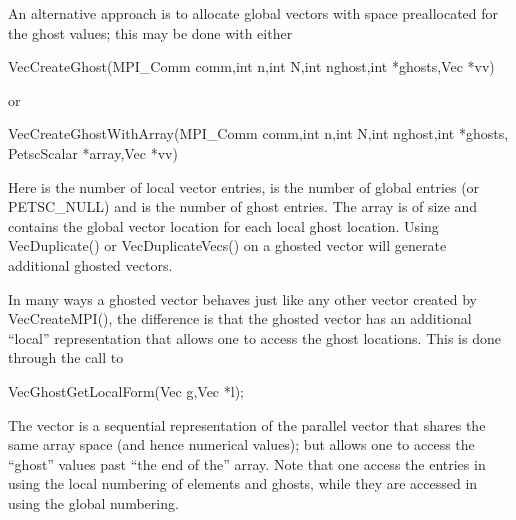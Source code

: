 An alternative approach is to allocate global vectors with space preallocated for 
the ghost values; this may be done with either 
\begin{tabbing}
  VecCreateGhost(MPI\_Comm comm,int n,int N,int nghost,int *ghosts,Vec *vv)
\end{tabbing}
or
\begin{tabbing}
  VecCreateGhostWithArray(MPI\_Comm comm,int n,int N,int nghost,int *ghosts,\\
                                  PetscScalar *array,Vec *vv)
\end{tabbing}
Here   is the 
number of local vector entries,  is the number of 
global entries (or PETSC_NULL) and  is the number of 
ghost entries. The array  is of size  and contains the 
global vector location for each local ghost location. Using VecDuplicate()
or VecDuplicateVecs() on a ghosted vector will generate additional ghosted vectors.

In many ways a ghosted vector behaves just like any other  vector created 
by VecCreateMPI(), the difference is that the ghosted vector has an additional 
``local'' representation that allows one to access the ghost locations. This is done
through the call to 
\begin{tabbing}
 VecGhostGetLocalForm(Vec g,Vec *l);
\end{tabbing}
The vector  is a 
sequential representation of the parallel vector  
that shares the same array space (and hence numerical values); but allows one to 
access the ``ghost'' values past ``the end of the'' array. Note that one access the 
entries in  using the local numbering of elements and ghosts, while they 
are accessed in  using the global numbering.

